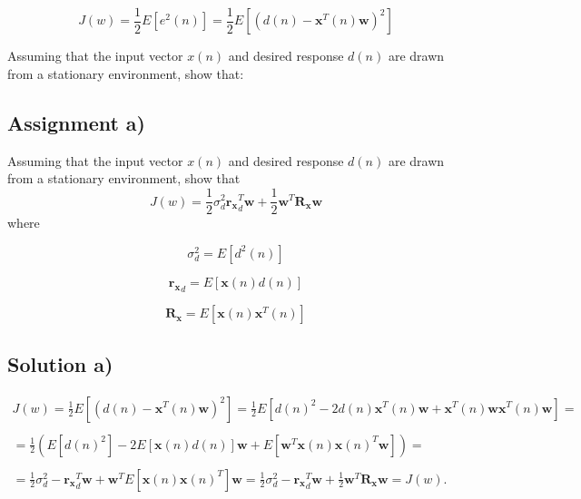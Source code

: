 \documentclass[a4paper, 12pt]{article}
\begin{document}
\begin{equation*}
J(w) = \frac{1}{2}E[e^2(n)] = \frac{1}{2}E[(d(n) - \mathbf{x}^T(n)\mathbf{w})^2]
\end{equation*}

Assuming that the input vector $x(n)$ and desired response $d(n)$ are drawn from a stationary environment, show that:


\subsection*{Assignment a)}
Assuming that the input vector $x(n)$ and desired response $d(n)$ are drawn from a stationary environment, show that
    \begin{equation*}
        J(w) = \frac{1}{2}\sigma^2_d\mathbf{r_x}_d^T\mathbf{w}+
        \frac{1}{2}\mathbf{w}^T\mathbf{R_x}\mathbf{w}
    \end{equation*}
    where

    \begin{equation*}
        \sigma_d^2 = E[d^2(n)]
    \end{equation*}


    \begin{equation*}
        \mathbf{r_x}_d = E[\mathbf{x}(n)d(n)]
    \end{equation*}

    \begin{equation*}
        \mathbf{R_x} = E[\mathbf{x}(n)\mathbf{x}^T(n)]
    \end{equation*}
\subsection*{Solution a)}


$$
\begin{array}{l}
J(w) = \frac{1}{2}E[(d(n) - \mathbf{x}^T(n)\mathbf{w})^2] = \frac{1}{2}E[d(n)^2 - 2 d(n)\mathbf{x}^T(n)\mathbf{w}+\mathbf{x}^T(n)\mathbf{w}\mathbf{x}^T(n)\mathbf{w}] = \\
\\
=\frac{1}{2}(E[d(n)^2] - 2E[\mathbf{x}(n)d(n)]\mathbf{w}+E[\mathbf{w}^T\mathbf{x}(n)\mathbf{x}(n)^T\mathbf{w}]) =\\
\\
=\frac{1}{2}\sigma_d^2 - \mathbf{r_x}_d^T\mathbf{w} + \mathbf{w}^T E[\mathbf{x}(n)\mathbf{x}(n)^T] \mathbf{w} = \frac{1}{2}\sigma_d^2 - \mathbf{r_x}_d^T\mathbf{w} +\frac{1}{2}\mathbf{w}^T \mathbf{R_x} \mathbf{w} = J(w).
\end{array}
$$
\end{document}
